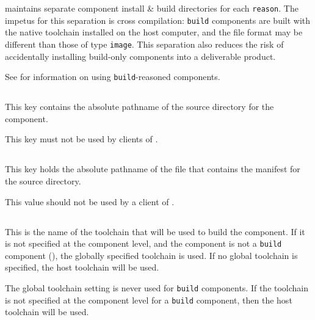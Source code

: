   \lmsbw maintains separate component install \& build directories for
  each \texttt{reason}.  The impetus for this separation is cross
  compilation: \texttt{build} components are built with the native
  toolchain installed on the host computer, and the file format may be
  different than those of type \texttt{image}.  This separation also
  reduces the risk of accidentally installing build-only components
  into a deliverable product.

  See  for information on using
  \texttt{build}-reasoned components.


\subsection{}\label{variables:source-directory}

This key contains the absolute pathname of the source directory for
the component.

This key must not be used by clients of \lmsbw.


\subsection{}\label{variables:source-mtree-manifest}

This key holds the absolute pathname of the file that contains the
\mtree manifest for the source directory.

This value should not be used by a client of \lmsbw.


\subsection{}\label{variables:toolchain}

This is the name of the toolchain that will be used to build the
component.  If it is not specified at the component level, and the
component is not a \texttt{build} component (),
the globally specified toolchain is used.  If no global toolchain is
specified, the host toolchain will be used.

The global toolchain setting is never used for \texttt{build}
components.  If the toolchain is not specified at the component level
for a \texttt{build} component, then the host toolchain will be used.

